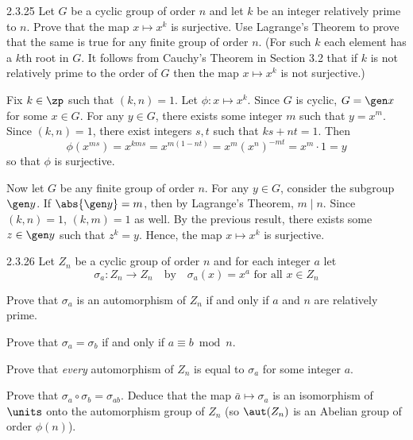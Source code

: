 \begin{exercise}{2.3.25}
    Let $G$ be a cyclic group of order $n$ and let $k$ be an integer relatively prime to $n$.
	Prove that the map $x \mapsto x^k$ is surjective.
	Use Lagrange's Theorem to prove that the same is true for any finite group of order $n$. (For such $k$ each element has a $k$th root in $G$.
	It follows from Cauchy's Theorem in Section 3.2 that if $k$ is not relatively prime to the order of $G$ then the map $x \mapsto x^k$ is not surjective.)
\end{exercise}

\begin{sol}
    Fix $k \in \zp$ such that $(k, n) = 1$.
	Let $\phi : x \mapsto x^k$.
	Since $G$ is cyclic, $G = \gen x$ for some $x \in G$.
	For any $y \in G$, there exists some integer $m$ such that $y = x^m$.
	Since $(k, n) = 1$, there exist integers $s, t$ such that $ks + nt = 1$.
	Then
    \[
    	\phi(x^{ms}) = x^{kms} = x^{m(1 - nt)} = x^m (x^n)^{-mt} = x^m \cdot 1 = y
    \]
    so that $\phi$ is surjective.

    Now let $G$ be any finite group of order $n$.
	For any $y \in G$, consider the subgroup $\gen y$.
	If $\abs{\gen y} = m$, then by Lagrange's Theorem, $m \mid n$.
	Since $(k, n) = 1$, $(k, m) = 1$ as well.
	By the previous result, there exists some $z \in \gen y$ such that $z^k = y$.
	Hence, the map $x \mapsto x^k$ is surjective.
\end{sol}

\begin{spex}{2.3.26}
    Let $Z_n$ be a cyclic group of order $n$ and for each integer $a$ let
    \[
    	\sigma_a : Z_n \to Z_n \quad \text{by} \quad \sigma_a(x) = x^a \text{ for all } x \in Z_n
    \]
    \begin{subexercises}
        \item Prove that $\sigma_a$ is an automorphism of $Z_n$ if and only if $a$ and $n$ are relatively prime.
        \item Prove that $\sigma_a = \sigma_b$ if and only if $a \equiv b \bmod n$.
        \item Prove that \emph{every} automorphism of $Z_n$ is equal to $\sigma_a$ for some integer $a$.
        \item Prove that $\sigma_a \circ \sigma_b = \sigma_{ab}$.
	    Deduce that the map $\bar a \mapsto \sigma_a$ is an isomorphism of $\units$ onto the automorphism group of $Z_n$ (so $\aut(Z_n)$ is an Abelian group of order $\phi(n)$).
    \end{subexercises}
\end{spex}

